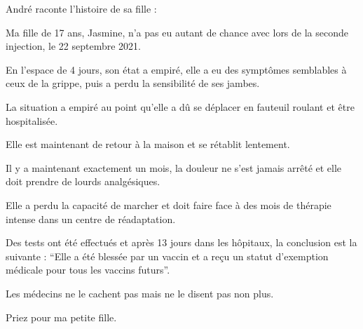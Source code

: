 André raconte l'histoire de sa fille :

Ma fille de 17 ans, Jasmine, n'a pas eu autant de chance avec lors de la seconde
injection, le 22 septembre 2021.

En l'espace de 4 jours, son état a empiré, elle a eu des symptômes semblables à
ceux de la grippe, puis a perdu la sensibilité de ses jambes.

La situation a empiré au point qu'elle a dû se déplacer en fauteuil roulant et
être hospitalisée.

Elle est maintenant de retour à la maison et se rétablit lentement.

Il y a maintenant exactement un mois, la douleur ne s'est jamais arrêté et elle
doit prendre de lourds analgésiques.

Elle a perdu la capacité de marcher et doit faire face à des mois de thérapie
intense dans un centre de réadaptation.

Des tests ont été effectués et après 13 jours dans les hôpitaux, la conclusion
est la suivante : “Elle a été blessée par un vaccin et a reçu un statut
d'exemption médicale pour tous les vaccins futurs”.

Les médecins ne le cachent pas mais ne le disent pas non plus.

Priez pour ma petite fille.

